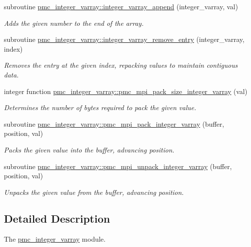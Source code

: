 \begin{DoxyCompactItemize}
subroutine \mbox{\hyperlink{namespacepmc__integer__varray_af69220e955a17e34968b502ba58301e0}{pmc\+\_\+integer\+\_\+varray\+::integer\+\_\+varray\+\_\+append}} (integer\+\_\+varray, val)
\begin{DoxyCompactList}\small\item\em Adds the given number to the end of the array. \end{DoxyCompactList}\item 
subroutine \mbox{\hyperlink{namespacepmc__integer__varray_a1a230c2b3f0b3c7374c02a9ddafed40b}{pmc\+\_\+integer\+\_\+varray\+::integer\+\_\+varray\+\_\+remove\+\_\+entry}} (integer\+\_\+varray, index)
\begin{DoxyCompactList}\small\item\em Removes the entry at the given index, repacking values to maintain contiguous data. \end{DoxyCompactList}\item 
integer function \mbox{\hyperlink{namespacepmc__integer__varray_a81d1258f19bf83286f41a25913d87094}{pmc\+\_\+integer\+\_\+varray\+::pmc\+\_\+mpi\+\_\+pack\+\_\+size\+\_\+integer\+\_\+varray}} (val)
\begin{DoxyCompactList}\small\item\em Determines the number of bytes required to pack the given value. \end{DoxyCompactList}\item 
subroutine \mbox{\hyperlink{namespacepmc__integer__varray_a4983f303a12ec1ff340ff2f2b738ed4d}{pmc\+\_\+integer\+\_\+varray\+::pmc\+\_\+mpi\+\_\+pack\+\_\+integer\+\_\+varray}} (buffer, position, val)
\begin{DoxyCompactList}\small\item\em Packs the given value into the buffer, advancing position. \end{DoxyCompactList}\item 
subroutine \mbox{\hyperlink{namespacepmc__integer__varray_a1cbb70e367cc28d2b7ee33490466f3ff}{pmc\+\_\+integer\+\_\+varray\+::pmc\+\_\+mpi\+\_\+unpack\+\_\+integer\+\_\+varray}} (buffer, position, val)
\begin{DoxyCompactList}\small\item\em Unpacks the given value from the buffer, advancing position. \end{DoxyCompactList}\end{DoxyCompactItemize}


\subsection{Detailed Description}
The \mbox{\hyperlink{namespacepmc__integer__varray}{pmc\+\_\+integer\+\_\+varray}} module. 

